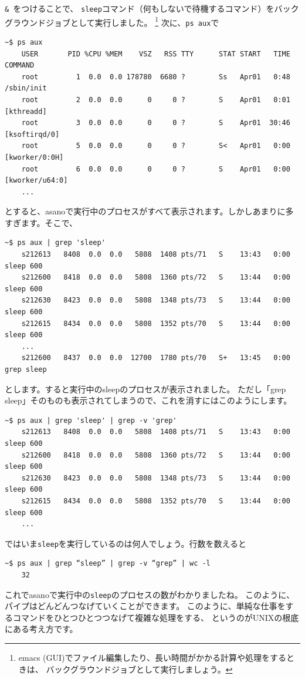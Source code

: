 \documentclass[a4j]{ltjreport}
\begin{document}
    \texttt{\& }をつけることで、
    \texttt{sleep}コマンド（何もしないで待機するコマンド）をバックグラウンドジョブとして実行しました。
    \footnote{emacs (GUI)でファイル編集したり、長い時間がかかる計算や処理をするときは、
    バックグラウンドジョブとして実行しましょう。} 次に、\texttt{ps aux}で
    \begin{lstlisting}[numbers=none]
    ~$ ps aux 
    USER       PID %CPU %MEM    VSZ   RSS TTY      STAT START   TIME COMMAND
    root         1  0.0  0.0 178780  6680 ?        Ss   Apr01   0:48 /sbin/init
    root         2  0.0  0.0      0     0 ?        S    Apr01   0:01 [kthreadd]
    root         3  0.0  0.0      0     0 ?        S    Apr01  30:46 [ksoftirqd/0]
    root         5  0.0  0.0      0     0 ?        S<   Apr01   0:00 [kworker/0:0H]
    root         6  0.0  0.0      0     0 ?        S    Apr01   0:00 [kworker/u64:0]
    ...
    \end{lstlisting}
    とすると、asanoで実行中のプロセスがすべて表示されます。しかしあまりに多すぎます。そこで、
    \begin{lstlisting}[numbers=none]
    ~$ ps aux | grep 'sleep'
    s212613   8408  0.0  0.0   5808  1408 pts/71   S    13:43   0:00 sleep 600
    s212600   8418  0.0  0.0   5808  1360 pts/72   S    13:44   0:00 sleep 600
    s212630   8423  0.0  0.0   5808  1348 pts/73   S    13:44   0:00 sleep 600
    s212615   8434  0.0  0.0   5808  1352 pts/70   S    13:44   0:00 sleep 600
    ...
    s212600   8437  0.0  0.0  12700  1780 pts/70   S+   13:45   0:00 grep sleep
    \end{lstlisting}
    とします。すると実行中のsleepのプロセスが表示されました。
    ただし「grep sleep」そのものも表示されてしまうので、これを消すにはこのようにします。
    \begin{lstlisting}[numbers=none]
    ~$ ps aux | grep 'sleep' | grep -v 'grep'
    s212613   8408  0.0  0.0   5808  1408 pts/71   S    13:43   0:00 sleep 600
    s212600   8418  0.0  0.0   5808  1360 pts/72   S    13:44   0:00 sleep 600
    s212630   8423  0.0  0.0   5808  1348 pts/73   S    13:44   0:00 sleep 600
    s212615   8434  0.0  0.0   5808  1352 pts/70   S    13:44   0:00 sleep 600
    ...
    \end{lstlisting}
    ではいま\texttt{sleep}を実行しているのは何人でしょう。行数を数えると
    \begin{lstlisting}[numbers=none]
    ~$ ps aux | grep “sleep” | grep -v “grep” | wc -l
    32
    \end{lstlisting}

    これでasanoで実行中の\texttt{sleep}のプロセスの数がわかりましたね。
    このように、パイプはどんどんつなげていくことができます。
    このように、単純な仕事をするコマンドをひとつひとつつなげて複雑な処理をする、
    というのがUNIXの根底にある考え方です。
    
\end{document}
